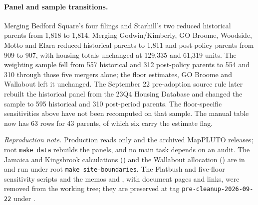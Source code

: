 \paragraph{Panel and sample transitions.}
Merging Bedford Square's four filings and Starhill's two reduced historical
parents from 1,818 to 1,814. Merging Godwin/Kimberly, GO Broome, Woodside,
Motto and Elara reduced historical parents to 1,811 and post-policy parents
from 909 to 907, with housing totals unchanged at 129,335 and 61,319 units.
The weighting sample fell from 557 historical and 312 post-policy parents to
554 and 310 through those five mergers alone; the floor estimates, GO Broome
and Wallabout left it unchanged. The September 22 pre-adoption source rule
later rebuilt the historical panel from the 23Q4 Housing Database and changed
the sample to 595 historical and 310 post-period parents. The
floor-specific sensitivities above have not been recomputed on that sample.
The manual table now has 63 rows for 43 parents, of which
six carry the estimate flag.

\textit{Reproduction note.} Production reads only
 and the
archived MapPLUTO releases; root \texttt{make data} rebuilds the panels, and
no main task depends on an audit. The Jamaica and Kingsbrook calculations
() and the Wallabout allocation
() are in
 and run under root
\texttt{make site-boundaries}. The Flatbush and five-floor sensitivity scripts
and the memos  and
, with document pages and links, were removed
from the working tree; they are preserved at tag
\texttt{pre-cleanup-2026-09-22} under
.
